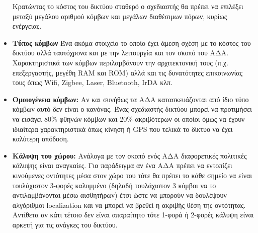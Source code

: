 \begin{itemize}
Κρατώντας το κόστος του δικτύου σταθερό ο σχεδιαστής θα πρέπει να επιλέξει μεταξύ μεγάλου αριθμού κόμβων και μεγάλων διαθέσιμων πόρων, κυρίως ενέργειας.
\item \textbf{Τύπος κόμβων} Ένα ακόμα στοιχείο το οποίο έχει άμεση σχέση με το κόστος του δικτύου αλλά ταυτόχρονα και με την λειτουργία και τον σκοπό του ΑΔΑ.
Χαρακτηριστικά των κόμβων περιλαμβάνουν την αρχιτεκτονική τους (π.χ. επεξεργαστής, μεγέθη RAM και ROM) αλλά και τις δυνατότητες επικοινωνίας τους όπως Wifi,
Zigbee, Laser, Bluetooth, IrDA κλπ.
\item \textbf{Ομοιογένεια κόμβων:} Αν και συνήθως τα ΑΔΑ κατασκευάζονται από ίδιο τύπο κόμβων αυτό δεν είναι ο κανόνας.
Ένας σχεδιαστής δικτύου μπορεί να προτιμήσει να εισάγει 80\% φθηνών κόμβων και 20\% ακριβότερων οι οποίοι όμως να έχουν ιδιαίτερα χαρακτηριστικά όπως κίνηση ή GPS που
τελικά το δίκτυο να έχει καλύτερη απόδοση.
\item \textbf{Κάλυψη του χώρου:} Ανάλογα με τον σκοπό ενός ΑΔΑ διαφορετικές πολιτικές κάλυψης είναι αναγκαίες.
Για παράδειγμα αν ένα ΑΔΑ πρέπει να εντοπίζει κινούμενες οντότητες μέσα στον χώρο του τότε θα πρέπει το κάθε σημείο να είναι τουλάχιστον 3-φορές καλυμμένο (δηλαδή
τουλάχιστον 3 κόμβοι να το αντιλαμβάνονται μέσω αισθητήρων) έτσι ώστε να μπορούν να δουλέψουν αλγόριθμοι localization και να μπορεί να βρεθεί η ακριβής θέση της
οντότητας.
Αντίθετα αν κάτι τέτοιο δεν είναι απαραίτητο τότε 1-φορά ή 2-φορές κάλυψη είναι αρκετή για τις ανάγκες του δικτύου.
\end{itemize}

